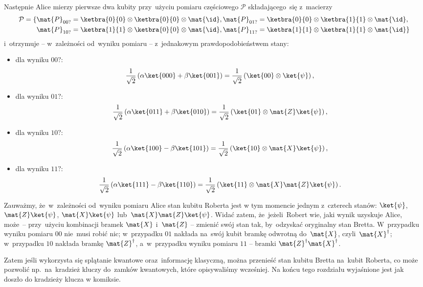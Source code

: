 Następnie Alice mierzy pierwsze dwa kubity przy~użyciu pomiaru częściowego $\mathcal{P}$ składającego~się z~macierzy
\begin{equation*}
	\begin{split}
		\mathcal{P} = \{&\mat{P}_{00?}=\ketbra{0}{0}\otimes\ketbra{0}{0}\otimes\mat{\id}, \mat{P}_{01?}=\ketbra{0}{0}\otimes\ketbra{1}{1}\otimes\mat{\id}, \\
		&\mat{P}_{10?}=\ketbra{1}{1}\otimes\ketbra{0}{0}\otimes\mat{\id}, \mat{P}_{11?}=\ketbra{1}{1}\otimes\ketbra{1}{1}\otimes\mat{\id}\}
	\end{split}
\end{equation*}
i~otrzymuje -- w~zależności od~wyniku pomiaru -- z~jednakowym prawdopodobieństwem stany:
\begin{itemize}
	\item dla wyniku $00?$: $$\frac{1}{\sqrt{2}}\left(\alpha \ket{000}  + \beta \ket{001}\right) = \frac{1}{\sqrt{2}}\left(\ket{00}\otimes \ket{\psi}\right),$$
	\item dla wyniku $01?$: $$\frac{1}{\sqrt{2}}\left(\alpha \ket{011}  + \beta \ket{010}\right) = \frac{1}{\sqrt{2}}\left(\ket{01}\otimes \mat{Z}\ket{\psi}\right),$$
	\item dla wyniku $10?$: $$\frac{1}{\sqrt{2}}\left(\alpha \ket{100}  - \beta \ket{101}\right) = \frac{1}{\sqrt{2}}\left(\ket{10}\otimes \mat{X}\ket{\psi}\right),$$
	\item dla wyniku $11?$: $$\frac{1}{\sqrt{2}}\left(\alpha \ket{111}  - \beta \ket{110}\right) = \frac{1}{\sqrt{2}}\left(\ket{11}\otimes \mat{X}\mat{Z}\ket{\psi}\right).$$
\end{itemize}

Zauważmy, że~w~zależności od~wyniku pomiaru Alice stan kubitu Roberta jest
w tym momencie jednym z~czterech stanów: $\ket{\psi}$,
$\mat{Z}\ket{\psi}$, $\mat{X}\ket{\psi}$ lub~$\mat{X}\mat{Z}\ket{\psi}$.
Widać zatem, że~jeżeli~Robert wie, jaki wynik uzyskuje Alice, może~--
przy~użyciu kombinacji bramek $\mat{X}$ i~$\mat{Z}$ -- zmienić swój stan
tak, by~odzyskać oryginalny stan Bretta. W~przypadku wyniku pomiaru $00$
nie~musi robić nic; w~przypadku $01$ nakłada na~swój kubit bramkę
odwrotną do~$\mat{X}$, czyli~$\mat{X}^\dagger$; w~przypadku $10$ nakłada
bramkę $\mat{Z}^\dagger$, a~w~przypadku wyniku pomiaru $11$ -- bramki
$\mat{Z}^\dagger \mat{X}^\dagger$.

Zatem jeśli wykorzysta się splątanie kwantowe oraz~informację klasyczną, można
przenieść stan kubitu Bretta na~kubit Roberta, co może pozwolić
np.~na~kradzież kluczy do~zamków kwantowych, które opisywaliśmy
wcześniej. Na końcu tego rozdziału wyjaśnione jest jak doszło do kradzieży
klucza w komiksie.
